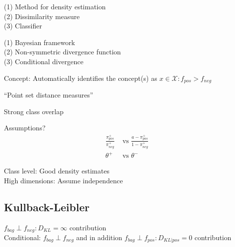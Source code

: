 \noindent (1) Method for density estimation\\
(2) Dissimilarity measure \\
(3) Classifier

\noindent (1) Bayesian framework\\
(2) Non-symmetric divergence function \\
(3) Conditional divergence



Concept: Automatically identifies the concept(s) as $x \in \mathcal{X}: f_{pos} > f_{neg}$

``Point set distance measures''

Strong class overlap

Assumptions?\\
\begin{align}
  \frac{\pi_{pos}^+}{\pi_{neg}^+} & \text{ vs } \frac{a-\pi_{pos}^+}{1-\pi_{neg}^+} \\
  \theta^+ & \text{ vs } \theta^-
\end{align}

Class level: Good density estimates\\
High dimensions: Assume independence

\subsection{Kullback-Leibler} 

$f_{bag} \perp f_{neg} : D_{KL} = \infty$ contribution \\
Conditional: $f_{bag} \perp f_{neg}$ and in addition $f_{bag} \perp f_{pos} : D_{KL|pos} = 0$ contribution